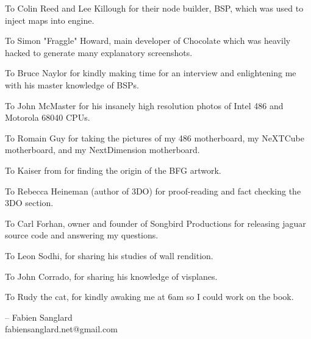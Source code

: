 \par
To Colin Reed and Lee Killough for their node builder, BSP, which was used to inject maps into \doom{} engine.\\
\par
To Simon "Fraggle" Howard, main developer of Chocolate \doom{} which was heavily hacked to generate many explanatory screenshots.\\
\par
To Bruce Naylor for kindly making time for an interview and enlightening me with his master knowledge of BSPs.\\
\par
To John McMaster for his insanely high resolution photos of Intel 486 and Motorola 68040 CPUs.\\
\par
To Romain Guy for taking the pictures of my 486 motherboard, my NeXTCube motherboard, and my NextDimension motherboard.\\
\par
To Kaiser from  for finding the origin of the BFG artwork.\\
\par
To Rebecca Heineman (author of \doom{} 3DO) for proof-reading and fact checking the 3DO section.\\
\par
To Carl Forhan, owner and founder of Songbird Productions for releasing \doom{} jaguar source code and answering my questions.\\
\par
To Leon Sodhi, for sharing his studies of \doom{} wall rendition.\\
\par
To John Corrado, for sharing his knowledge of visplanes.\\
\par
To Rudy the cat, for kindly awaking me at 6am so I could work on the book.\\
\par
-- Fabien Sanglard\\
fabiensanglard.net@gmail.com

